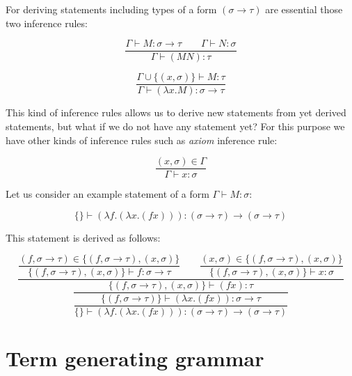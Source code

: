 \documentclass[12pt,a4paper]{report}
\newcommand{\Lets}{Let us\xspace}
\newcommand{\turst}[3]{$#1 \vdash #2 : #3$\xspace}
\newcommand{\GMS}{\turst{\Gamma}{M}{\sigma}}
\begin{document}
	For deriving statements including types of a form 
	$(\sigma \rightarrow \tau)$ are essential those two 
	inference rules:
	
	\begin{equation*}
		\frac{\Gamma \vdash M : \sigma \rightarrow \tau \qquad
			  \Gamma \vdash N : \sigma }
		     {\Gamma \vdash (M N) : \tau }
	\end{equation*}	
	
	\begin{equation*}
		\frac{\Gamma \cup \{ ( x,\sigma ) \} \vdash M : \tau }
		     {\Gamma \vdash (\lambda x . M) : \sigma \rightarrow \tau }
	\end{equation*}		 
	 
	This kind of inference rules allows us to derive new statements from yet derived statements, but 
	what if we do not have any statement yet? 
	For this purpose we have other kinds of inference rules such as {\it axiom} inference rule:   
	
	\begin{equation*}
		\frac{( x , \sigma )  \in \Gamma}
		     {\Gamma \vdash x : \sigma}
	\end{equation*}	
	
	\Lets consider an example statement of a form \GMS :
	
	\[
		\{\} \vdash (\lambda f . (\lambda x . (f x) )) : 
		(\sigma \rightarrow \tau) \rightarrow ( \sigma \rightarrow \tau ) 
	\]
		
	This statement is derived as follows: 
	
	\begin{equation*}
	\dfrac{
		\dfrac{ (f,\sigma \rightarrow \tau) \in \{ (f,\sigma \rightarrow \tau) , (x,\sigma)  \}  }
		     { \{ (f,\sigma \rightarrow \tau) , (x,\sigma)  \} \vdash f : \sigma \rightarrow \tau }
		\qquad
		\dfrac{ (x,\sigma) \in \{ (f,\sigma \rightarrow \tau) , (x,\sigma)  \}  }
		     { \{ (f,\sigma \rightarrow \tau) , (x,\sigma)  \} \vdash x : \sigma }
		 }
		 {
			\dfrac{		 	
		 		\{ (f,\sigma \rightarrow \tau) , (x,\sigma)  \} \vdash (f x) : \tau
		 	}{
				\dfrac{\{ (f,\sigma \rightarrow \tau) \} \vdash (\lambda x . (f x) ) : 
				\sigma \rightarrow \tau}
				{ \{ \} \vdash (\lambda f . (\lambda x . (f x) ) ) 
				  : (\sigma \rightarrow \tau) \rightarrow (\sigma \rightarrow \tau) }
		 	}
		 }
	\end{equation*}		



	
\section{Term generating grammar}
\end{document}
